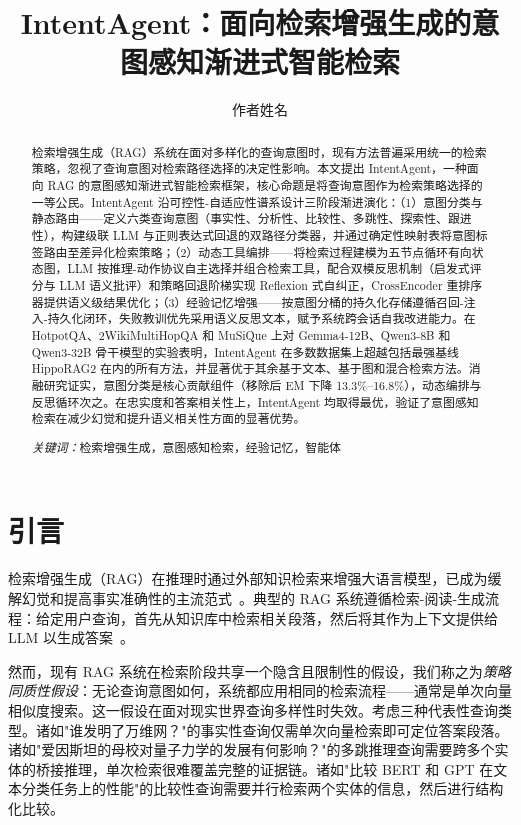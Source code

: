 \documentclass[runningheads]{llncs}
\begin{document}
\title{IntentAgent：面向检索增强生成的意图感知渐进式智能检索}

\author{作者姓名}

\maketitle

\begin{abstract}
检索增强生成（RAG）系统在面对多样化的查询意图时，现有方法普遍采用统一的检索策略，忽视了查询意图对检索路径选择的决定性影响。本文提出 IntentAgent，一种面向 RAG 的意图感知渐进式智能检索框架，核心命题是将查询意图作为检索策略选择的一等公民。IntentAgent 沿可控性-自适应性谱系设计三阶段渐进演化：（1）意图分类与静态路由——定义六类查询意图（事实性、分析性、比较性、多跳性、探索性、跟进性），构建级联 LLM 与正则表达式回退的双路径分类器，并通过确定性映射表将意图标签路由至差异化检索策略；（2）动态工具编排——将检索过程建模为五节点循环有向状态图，LLM 按推理-动作协议自主选择并组合检索工具，配合双模反思机制（启发式评分与 LLM 语义批评）和策略回退阶梯实现 Reflexion 式自纠正，CrossEncoder 重排序器提供语义级结果优化；（3）经验记忆增强——按意图分桶的持久化存储遵循召回-注入-持久化闭环，失败教训优先采用语义反思文本，赋予系统跨会话自我改进能力。在 HotpotQA、2WikiMultiHopQA 和 MuSiQue 上对 Gemma4-12B、Qwen3-8B 和 Qwen3-32B 骨干模型的实验表明，IntentAgent 在多数数据集上超越包括最强基线 HippoRAG2 在内的所有方法，并显著优于其余基于文本、基于图和混合检索方法。消融研究证实，意图分类是核心贡献组件（移除后 EM 下降 13.3\%--16.8\%），动态编排与反思循环次之。在忠实度和答案相关性上，IntentAgent 均取得最优，验证了意图感知检索在减少幻觉和提升语义相关性方面的显著优势。

\noindent\textit{关键词：}检索增强生成，意图感知检索，经验记忆，智能体
\end{abstract}

\section{引言}

检索增强生成（RAG）在推理时通过外部知识检索来增强大语言模型，已成为缓解幻觉和提高事实准确性的主流范式~\cite{ref1}。典型的 RAG 系统遵循检索-阅读-生成流程：给定用户查询，首先从知识库中检索相关段落，然后将其作为上下文提供给 LLM 以生成答案~\cite{ref2}。

然而，现有 RAG 系统在检索阶段共享一个隐含且限制性的假设，我们称之为\emph{策略同质性假设}：无论查询意图如何，系统都应用相同的检索流程——通常是单次向量相似度搜索。这一假设在面对现实世界查询多样性时失效。考虑三种代表性查询类型。诸如"谁发明了万维网？"的事实性查询仅需单次向量检索即可定位答案段落。诸如"爱因斯坦的母校对量子力学的发展有何影响？"的多跳推理查询需要跨多个实体的桥接推理，单次检索很难覆盖完整的证据链。诸如"比较 BERT 和 GPT 在文本分类任务上的性能"的比较性查询需要并行检索两个实体的信息，然后进行结构化比较。
\end{document}
